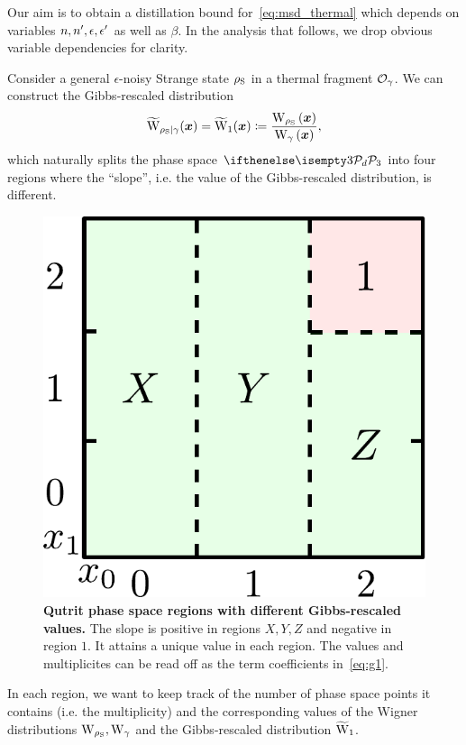 \documentclass[pra,
aps,
twocolumn,
superscriptaddress,
groupedaddress,
nofootinbib,
reprint
]{revtex4-1}
\begin{document}
Our aim is to obtain a distillation bound for~\cref{eq:msd_thermal} which depends on variables $n, \tt, \epsilon, \epsilon'$ as well as $\beta$.
In the analysis that follows, we drop obvious variable dependencies for clarity.

Consider a general $\epsilon$-noisy Strange state $\noisys$ in a thermal fragment $\O_{\gamma}$.
We can construct the Gibbs-rescaled distribution 
\begin{equation}
	\widetilde{\rm{W}}_{\noisys|\gamma}(\bmx) = \widetilde{\rm{W}}_1(\bmx) \coloneqq \frac{\W[\bmx]{\noisys}}{\W[\bmx]{\gamma}},
\end{equation}
which naturally splits the phase space $\pd[3]$ into four regions where the ``slope'', i.e. the value of the Gibbs-rescaled distribution, is different.
\begin{figure}[h]
    \centering
    \includegraphics[scale=0.5]{figs/pd_split_thermal.pdf}
    \caption{\textbf{Qutrit phase space regions with different Gibbs-rescaled values.}
    The slope is positive in regions $X,Y,Z$ and negative in region $1$.
    It attains a unique value in each region.
    The values and multiplicites can be read off as the term coefficients in~\cref{eq:g1}.
    }
    \label{fig:pd_split_thermal}
\end{figure}
In each region, we want to keep track of the number of phase space points it contains (i.e. the multiplicity) and the corresponding values of the Wigner distributions $\W{\noisys}, \W{\gamma}$ and the Gibbs-rescaled distribution $\widetilde{\rm{W}}_1$. 
\end{document}
